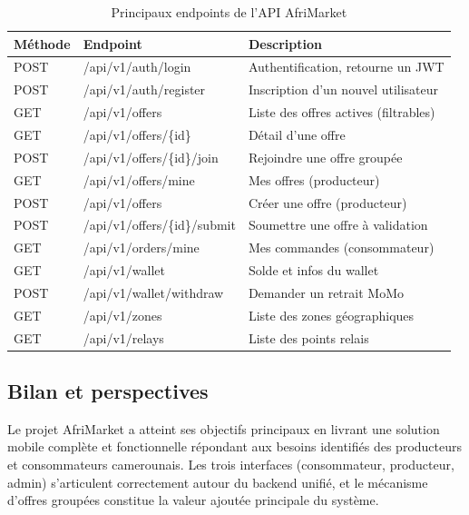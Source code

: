 \documentclass[12pt, a4paper, oneside]{report}
\begin{document}
\begin{table}[H]
  \centering
  \caption{Principaux endpoints de l'API AfriMarket}
  \label{tab:api_endpoints}
  \begin{tabular}{|l|l|l|}
    \hline
    \textbf{Méthode} & \textbf{Endpoint} & \textbf{Description} \\
    \hline
    POST & /api/v1/auth/login & Authentification, retourne un JWT \\
    \hline
    POST & /api/v1/auth/register & Inscription d'un nouvel utilisateur \\
    \hline
    GET  & /api/v1/offers & Liste des offres actives (filtrables) \\
    \hline
    GET  & /api/v1/offers/\{id\} & Détail d'une offre \\
    \hline
    POST & /api/v1/offers/\{id\}/join & Rejoindre une offre groupée \\
    \hline
    GET  & /api/v1/offers/mine & Mes offres (producteur) \\
    \hline
    POST & /api/v1/offers & Créer une offre (producteur) \\
    \hline
    POST & /api/v1/offers/\{id\}/submit & Soumettre une offre à validation \\
    \hline
    GET  & /api/v1/orders/mine & Mes commandes (consommateur) \\
    \hline
    GET  & /api/v1/wallet & Solde et infos du wallet \\
    \hline
    POST & /api/v1/wallet/withdraw & Demander un retrait MoMo \\
    \hline
    GET  & /api/v1/zones & Liste des zones géographiques \\
    \hline
    GET  & /api/v1/relays & Liste des points relais \\
    \hline
  \end{tabular}
\end{table}

\subsection{Bilan et perspectives}

Le projet AfriMarket a atteint ses objectifs principaux en livrant une solution mobile
complète et fonctionnelle répondant aux besoins identifiés des producteurs et consommateurs
camerounais. Les trois interfaces (consommateur, producteur, admin) s'articulent
correctement autour du backend unifié, et le mécanisme d'offres groupées constitue la
valeur ajoutée principale du système.
\end{document}
